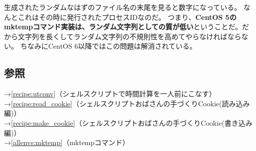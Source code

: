 生成されたランダムなはずのファイル名の末尾を見ると数字になっている。
なんとこれはその時に発行されたプロセスIDなのだ。
つまり、\textbf{CentOS 5のmktempコマンド実装は、ランダム文字列としての質が低い}ということだ。だから文字列を長くしてランダム文字列の不規則性を高めてやらなければならない。
ちなみにCentOS 6以降ではこの問題は解消されている。

\subsection*{参照}

\noindent
→\ref{recipe:utconv}（シェルスクリプトで時間計算を一人前にこなす）\\
→\ref{recipe:read_cookie}（シェルスクリプトおばさんの手づくりCookie(読み込み編)）\\
→\ref{recipe:make_cookie}（シェルスクリプトおばさんの手づくりCookie(書き込み編)）\\
→\ref{allenvs:mktemp}（mktempコマンド）
